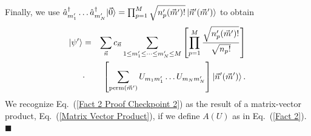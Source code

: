 \documentclass[aps,pra,twocolumn,superscriptaddress,floatfix,10pt]{revtex4}
\begin{document}
Finally, we use $\hat{a}_{m_1^\prime}^\dagger \dots \hat{a}_{m_N^\prime}^\dagger |\vec{0} \rangle =  \prod_{p=1}^{M} \sqrt{ n_p^\prime(\vec{m}^\prime)! } \ket{\vec{n}^\prime(\vec{m}^\prime)} $ to obtain
\begin{eqnarray}
\label{Fact 2 Proof Checkpoint 2}
\small \ket{\psi^\prime} &=& \sum_{\vec{n}} c_{\vec{n}}   \sum_{1 \le m_1^\prime \le \cdots \le m_N^\prime \le M}
\left[ \prod_{p=1}^{M} \frac{\sqrt{n_p^\prime(\vec{m}^\prime) !}}{ \sqrt{n_p !}} \right] \\  \nonumber &\cdot&  \left[ \sum_{\textrm{perm}(\vec{m}^\prime)} U_{m_1 m_1^\prime} \dots U_{m_N m_N^\prime} \right] 
 \ket{\vec{n}^\prime (\vec{m}^\prime) } .
\end{eqnarray}
We recognize Eq.~(\ref{Fact 2 Proof Checkpoint 2}) as the result of a matrix-vector product, Eq.~(\ref{Matrix Vector Product}), if we define $A(U)$ as in Eq.~(\ref{Fact 2}).  $ \blacksquare $
\end{document}
